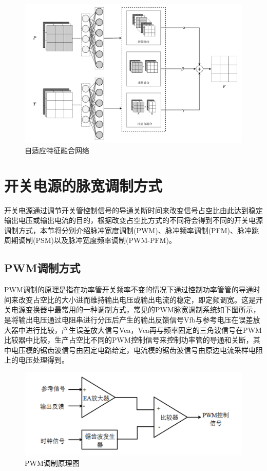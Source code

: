 \begin{figure}[htbp] 
    \centering
    \includegraphics[width=0.8\linewidth]{imgs/Adaptive Fusion NetWork.pdf}
    \caption{自适应特征融合网络}
    \label{fig:Adaptive Fusion NetWork}
\end{figure}

\section{开关电源的脉宽调制方式}
开关电源通过调节开关管控制信号的导通关断时间来改变信号占空比由此达到稳定输出电压或输出电流的目的，根据改变占空比方式的不同将会得到不同的开关电源调制方式，本节将分别介绍脉冲宽度调制(PWM)、脉冲频率调制(PFM)、脉冲跳周期调制(PSM)以及脉冲宽度频率调制(PWM-PFM)。

\subsection{PWM调制方式}
PWM调制的原理是指在功率管开关频率不变的情况下通过控制功率管管的导通时间来改变占空比的大小进而维持输出电压或输出电流的稳定，即定频调宽。这是开关电源变换器中最常用的一种调制方式，常见的PWM脉宽调制系统如下图所示，是将输出电压通过电阻串进行分压后产生的输出反馈信号Vfb与参考电压在误差放大器中进行比较，产生误差放大信号Vea，Vea再与频率固定的三角波信号在PWM比较器中比较，生产占空比不同的PWM控制信号来控制功率管的导通和关断，其中电压模的锯齿波信号由固定电路给定，电流模的锯齿波信号由原边电流采样电阻上的电压处理得到。

\begin{figure}[htbp] 
    \centering
    \includegraphics[width=0.8\linewidth]{figures/PWM调制1.png}
    \caption{PWM调制原理图}
    \label{fig:PWM调制1}
\end{figure}

